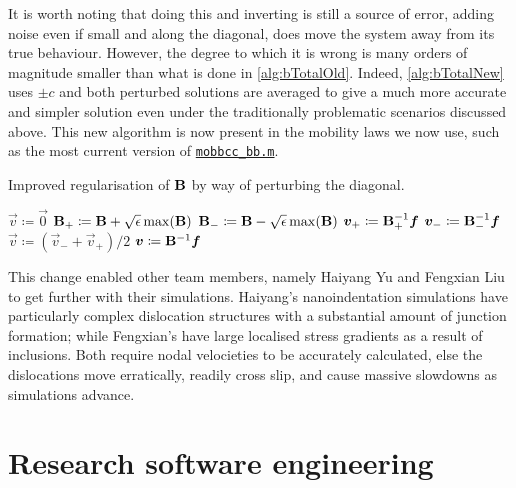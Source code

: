 It is worth noting that doing this and inverting is still a source of error, adding noise even if small and along the diagonal, does move the system away from its true behaviour. However, the degree to which it is wrong is many orders of magnitude smaller than what is done in \cref{alg:bTotalOld}. Indeed, \cref{alg:bTotalNew} uses $\pm c $ and both perturbed solutions are averaged to give a much more accurate and simpler solution even under the traditionally problematic scenarios discussed above. This new algorithm is now present in the mobility laws we now use, such as the most current version of \href{https://github.com/TarletonGroup/EasyDD/blob/372984499dd60136fc7badabd6cee192058d55d9/src/mobbcc_bb1b.m#L199}{\texttt{mobbcc\_bb.m}}.
\begin{algorithm}
    \caption{Improved regularisation of $\mathbf{B}$ by way of perturbing the diagonal.}
    \label{alg:bTotalNew}
    \begin{algorithmic}
        \State $\vec{v} \coloneqq \vec{0}$
        \State $\mathbf{B}_+ \coloneqq \mathbf{B} + \sqrt{\epsilon} \max(\mathbf{B})$
        \State $\mathbf{B}_- \coloneqq \mathbf{B} - \sqrt{\epsilon} \max(\mathbf{B})$
        \State $\vec{v}_+ \coloneqq \mtx{B}_+^{-1} \vec{f}$
        \State $\vec{v}_- \coloneqq \mtx{B}_-^{-1} \vec{f}$
        \State $\vec{v} \coloneqq (\vec{v}_- + \vec{v}_+)/2$
        \Else
        \State $\vec{v} \coloneqq \mtx{B}^{-1} \vec{f}$
        \EndIf
    \end{algorithmic}
\end{algorithm}

This change enabled other team members, namely Haiyang Yu and Fengxian Liu to get further with their simulations. Haiyang's nanoindentation simulations have particularly complex dislocation structures with a substantial amount of junction formation; while Fengxian's have large localised stress gradients as a result of inclusions. Both require nodal velocieties to be accurately calculated, else the dislocations move erratically, readily cross slip, and cause massive slowdowns as simulations advance.

\section{Research software engineering}
\label{s:rse}

